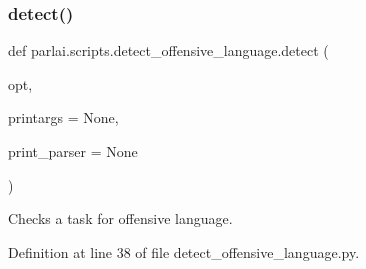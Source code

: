 \subsubsection{\texorpdfstring{detect()}{detect()}}
{\footnotesize\ttfamily def parlai.\+scripts.\+detect\+\_\+offensive\+\_\+language.\+detect (\begin{DoxyParamCaption}\item[{}]{opt,  }\item[{}]{printargs = {\ttfamily None},  }\item[{}]{print\+\_\+parser = {\ttfamily None} }\end{DoxyParamCaption})}

\begin{DoxyVerb}Checks a task for offensive language.
\end{DoxyVerb}
 

Definition at line 38 of file detect\+\_\+offensive\+\_\+language.\+py.


